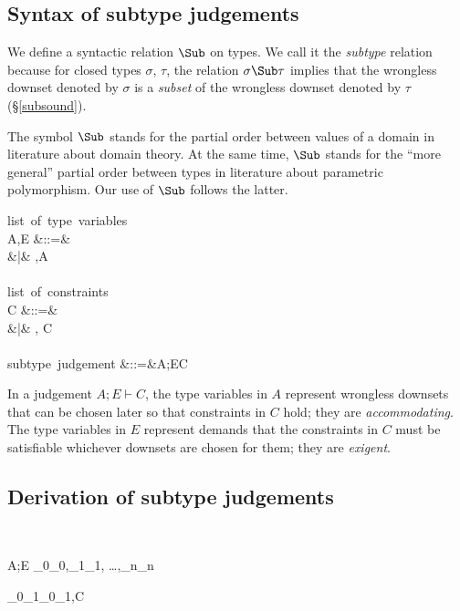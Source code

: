 \documentclass{amsart}
\theoremstyle{definition}
\begin{document}
\subsection{Syntax of subtype judgements}

We define a syntactic relation $\Sub$ on types. We call it the
\emph{subtype} relation because for closed types $\sigma$,
$\tau$, the relation $\sigma \Sub \tau$ implies that the
wrongless downset denoted by $\sigma$ is a \emph{subset} of the
wrongless downset denoted by $\tau$ (\S\ref{subsound}).

The symbol $\Sub$ stands for the partial order between values of
a domain in literature about domain theory. At the same time,
$\Sub$ stands for the ``more general'' partial order between
types in literature about parametric polymorphism. Our use of
$\Sub$ follows the latter.

\begin{syntax}
\mbox{list of type variables}\\
A,E
&::=& \emptyset \\
&|& \alpha,A
\\
\\
\mbox{list of constraints}\\
C
&::=& \emptyset \\
&|& \sigma \Sub \tau, C
\\
\\
\mbox{subtype judgement}
&::=&A;E\vdash C
\end{syntax}

In a judgement $A;E\vdash C$, the type variables in $A$ represent
wrongless downsets that can be chosen later so that constraints
in $C$ hold; they are \emph{accommodating}. The type variables in
$E$ represent demands that the constraints in $C$ must be
satisfiable whichever downsets are chosen for them; they are
\emph{exigent}.

\subsection{Derivation of subtype judgements}~

\infrule[S-Refl]
{}
{A;E \vdash \tau_0\Sub\tau_0,\tau_1\Sub\tau_1,
\ldots,\tau_n\Sub\tau_n}

{\Delta\vdash\sigma_0\R\sigma_1\Sub\tau_0\R\tau_1,C}

\end{document}
